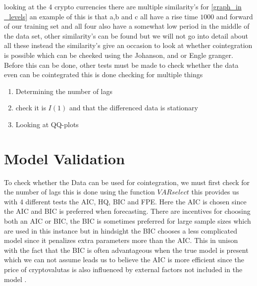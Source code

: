 \noindent looking at the 4 crypto currencies there are multiple similarity's for \ref{graph_in _levels} an example of this is that a,b and c all have a rise time $1000$ and forward of our training set and all four also have a somewhat low period in the middle of the data set, other similarity's can be found but we will not go into detail about all these instead the similarity's give an occasion to look at whether cointegration is possible which can be cheeked using the Johanson, and or Engle granger. Before this can be done, other tests must be made to check whether the data even can be cointegrated this is done checking for multiple things 
\begin{enumerate}
    \item Determining the number of lags
    \item check it is $I(1)$ and that the differenced data is stationary 
    \item Looking at QQ-plots
\end{enumerate}

\section{Model Validation}
To check whether the Data can be used for cointegration, we must first check for the number of lags this is done using the function $VARselect$ this provides us with 4 different tests the AIC, HQ, BIC and FPE. Here the AIC is chosen since the AIC and BIC is preferred when forecasting. There are incentives for choosing both an AIC or BIC, the BIC is sometimes preferred for large sample sizes which are used in this instance but in hindsight the BIC chooses a less complicated model since it penalizes extra parameters more than the AIC. This in unison with the fact that the BIC is often advantageous when the true model is present which we can not assume leads us to believe the AIC is more efficient since the price of cryptovalutas is also influenced by external factors not included in the model \cite{AICorBIC}.

\pause
